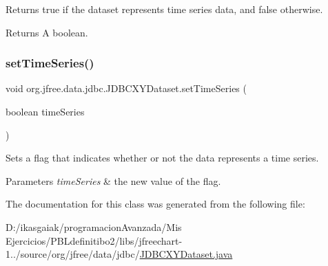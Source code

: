 Returns {\ttfamily true} if the dataset represents time series data, and {\ttfamily false} otherwise.

\begin{DoxyReturn}{Returns}
A boolean. 
\end{DoxyReturn}
\mbox{\label{classorg_1_1jfree_1_1data_1_1jdbc_1_1_j_d_b_c_x_y_dataset_ab1499d012261ebffb4b5cae1923d881a}} 
\subsubsection{\texorpdfstring{set\+Time\+Series()}{setTimeSeries()}}
{\footnotesize\ttfamily void org.\+jfree.\+data.\+jdbc.\+J\+D\+B\+C\+X\+Y\+Dataset.\+set\+Time\+Series (\begin{DoxyParamCaption}\item[{boolean}]{time\+Series }\end{DoxyParamCaption})}

Sets a flag that indicates whether or not the data represents a time series.


\begin{DoxyParams}{Parameters}
{\em time\+Series} & the new value of the flag. \\
\hline
\end{DoxyParams}


The documentation for this class was generated from the following file\+:\begin{DoxyCompactItemize}
\item 
D\+:/ikasgaiak/programacion\+Avanzada/\+Mis Ejercicios/\+P\+B\+Ldefinitibo2/libs/jfreechart-\/1../source/org/jfree/data/jdbc/\mbox{\hyperlink{_j_d_b_c_x_y_dataset_8java}{J\+D\+B\+C\+X\+Y\+Dataset.\+java}}\end{DoxyCompactItemize}
